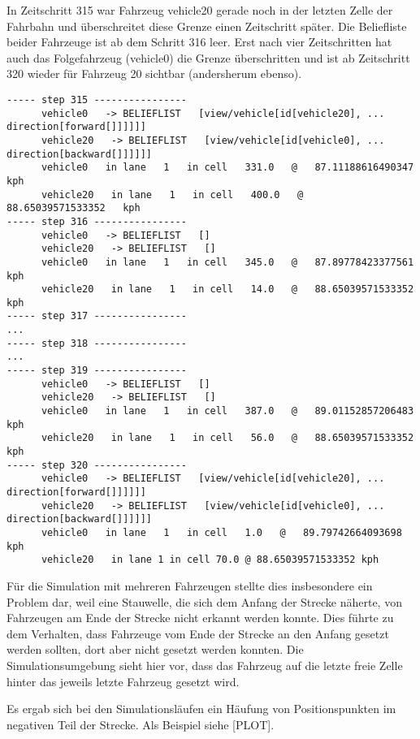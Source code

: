 In Zeitschritt 315 war Fahrzeug vehicle20 gerade noch in der letzten Zelle der Fahrbahn und überschreitet diese Grenze einen Zeitschritt später.
Die Beliefliste beider Fahrzeuge ist ab dem Schritt 316 leer.
Erst nach vier Zeitschritten hat auch das Folgefahrzeug (vehicle0) die Grenze überschritten und ist ab Zeitschritt 320 wieder für Fahrzeug 20 sichtbar (andersherum ebenso).

\footnotesize\begin{verbatim}
----- step 315 ----------------
      vehicle0   -> BELIEFLIST   [view/vehicle[id[vehicle20], ... direction[forward[]]]]]]
      vehicle20   -> BELIEFLIST   [view/vehicle[id[vehicle0], ... direction[backward[]]]]]]
      vehicle0   in lane   1   in cell   331.0   @   87.11188616490347   kph
      vehicle20   in lane   1   in cell   400.0   @   88.65039571533352   kph
----- step 316 ----------------
      vehicle0   -> BELIEFLIST   []
      vehicle20   -> BELIEFLIST   []
      vehicle0   in lane   1   in cell   345.0   @   87.89778423377561   kph
      vehicle20   in lane   1   in cell   14.0   @   88.65039571533352   kph
----- step 317 ----------------
...
----- step 318 ----------------
...
----- step 319 ----------------
      vehicle0   -> BELIEFLIST   []
      vehicle20   -> BELIEFLIST   []
      vehicle0   in lane   1   in cell   387.0   @   89.01152857206483   kph
      vehicle20   in lane   1   in cell   56.0   @   88.65039571533352   kph
----- step 320 ----------------
      vehicle0   -> BELIEFLIST   [view/vehicle[id[vehicle20], ... direction[forward[]]]]]]
      vehicle20   -> BELIEFLIST   [view/vehicle[id[vehicle0], ... direction[backward[]]]]]]
      vehicle0   in lane   1   in cell   1.0   @   89.79742664093698   kph
      vehicle20   in lane 1 in cell 70.0 @ 88.65039571533352 kph
\end{verbatim}
\normalsize

Für die Simulation mit mehreren Fahrzeugen stellte dies insbesondere ein Problem dar, weil eine Stauwelle, die sich dem Anfang der Strecke näherte, von Fahrzeugen am Ende der Strecke nicht erkannt werden konnte.
Dies führte zu dem Verhalten, dass Fahrzeuge vom Ende der Strecke an den Anfang gesetzt werden sollten, dort aber nicht gesetzt werden konnten.
Die Simulationsumgebung sieht hier vor, dass das Fahrzeug auf die letzte freie Zelle hinter das jeweils letzte Fahrzeug gesetzt wird.

Es ergab sich bei den Simulationsläufen ein Häufung von Positionspunkten im negativen Teil der Strecke. 
Als Beispiel siehe [PLOT].

